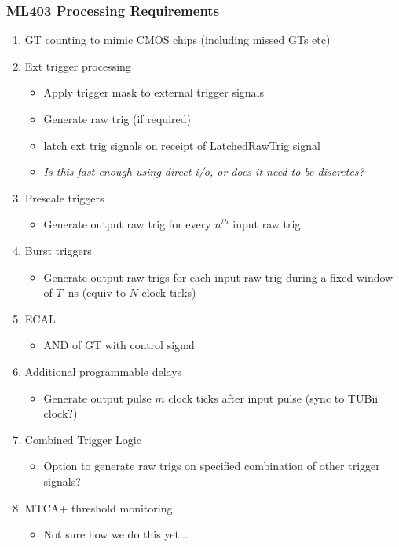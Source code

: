 \documentclass[letter, 11pt]{article}
\begin{document}
\subsubsection{ML403 Processing Requirements}
\begin{enumerate}
\item GT counting to mimic CMOS chips (including missed GTs etc)
\item Ext trigger processing
\begin{itemize}
\item Apply trigger mask to external trigger signals
\item Generate raw trig (if required)
\item latch ext trig signals on receipt of LatchedRawTrig signal
\item \it{Is this fast enough using direct i/o, or does it need to be discretes?}
\end{itemize}
\item Prescale triggers
\begin{itemize}
\item Generate output raw trig for every $n^{th}$ input raw trig
\end{itemize}
\item Burst triggers
\begin{itemize}
\item Generate output raw trigs for each input raw trig during a fixed window of $T$~ns (equiv to $N$ clock ticks)
\end{itemize}
\item ECAL
\begin{itemize}
\item AND of GT with control signal
\end{itemize}
\item Additional programmable delays
\begin{itemize}
\item Generate output pulse $m$ clock ticks after input pulse (sync to TUBii clock?) 
\end{itemize}
\item Combined Trigger Logic
\begin{itemize}
\item Option to generate raw trigs on specified combination of other trigger signals?
\end{itemize}
\item MTCA+ threshold monitoring
\begin{itemize}
\item Not sure how we do this yet...
\end{itemize}


\end{enumerate}
\end{document}
